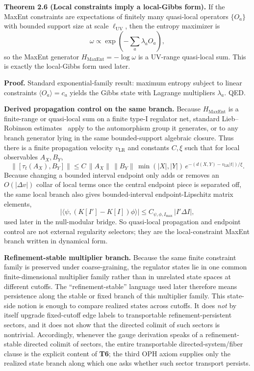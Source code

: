 \textbf{Theorem 2.6 (Local constraints imply a local-Gibbs form).} If the MaxEnt constraints are expectations of finitely many quasi-local operators \(\{O_a\}\) with bounded support size at scale \(\ell_{\mathrm{UV}}\), then the entropy maximizer is
\[
\omega \propto \exp\!\left(-\sum_a \lambda_a O_a\right),
\]
so the MaxEnt generator \(H_{\mathrm{MaxEnt}}=-\log\omega\) is a UV-range quasi-local sum. This is exactly the local-Gibbs form used later.

\textbf{Proof.} Standard exponential-family result: maximum entropy subject to linear constraints \(\langle O_a\rangle=c_a\) yields the Gibbs state with Lagrange multipliers \(\lambda_a\). QED.

\textbf{Derived propagation control on the same branch.} Because \(H_{\mathrm{MaxEnt}}\) is a finite-range or quasi-local sum on a finite type-I regulator net, standard Lieb--Robinson estimates~\cite{liebRobinson72} apply to the automorphism group it generates, or to any branch generator lying in the same bounded-support algebraic closure. Thus there is a finite propagation velocity \(v_{\mathrm{LR}}\) and constants \(C,\xi\) such that for local observables \(A_X,B_Y\),
\[
\bigl\|[\tau_t(A_X),B_Y]\bigr\|
\le
C\,\|A_X\|\,\|B_Y\|\,\min(|X|,|Y|)\,
e^{-(d(X,Y)-v_{\mathrm{LR}}|t|)/\xi}.
\]
Because changing a bounded interval endpoint only adds or removes an \(O(|\Delta v|)\) collar of local terms once the central endpoint piece is separated off, the same local branch also gives bounded-interval endpoint-Lipschitz matrix elements,
\[
\left|\langle\psi,(K[I']-K[I])\phi\rangle\right|
\le
C_{\psi,\phi,I_{\max}}\,|I'\Delta I|,
\]
used later in the null-modular bridge. So quasi-local propagation and endpoint control are not external regularity selectors; they are the local-constraint MaxEnt branch written in dynamical form.

\textbf{Refinement-stable multiplier branch.} Because the same finite constraint family is preserved under coarse-graining, the regulator states lie in one common finite-dimensional multiplier family rather than in unrelated state spaces at different cutoffs. The ``refinement-stable'' language used later therefore means persistence along the stable or fixed branch of this multiplier family. This state-side notion is enough to compare realized states across cutoffs. It does \emph{not} by itself upgrade fixed-cutoff edge labels to transportable refinement-persistent sectors, and it does not show that the directed colimit of such sectors is nontrivial. Accordingly, whenever the gauge derivation speaks of a refinement-stable directed colimit of sectors, the entire transportable directed-system/fiber clause is the explicit content of \textbf{T6}; the third OPH axiom supplies only the realized state branch along which one asks whether such sector transport persists.

